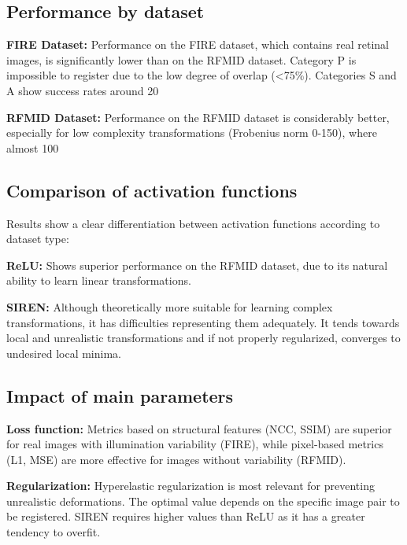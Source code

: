 \subsection{Performance by dataset}
\label{subsec:Rendemento por dataset}

\textbf{FIRE Dataset:} Performance on the FIRE dataset, which contains real retinal images, is significantly lower than on the RFMID dataset. Category P is impossible to register due to the low degree of overlap (<75\%). Categories S and A show success rates around 20%

\textbf{RFMID Dataset:} Performance on the RFMID dataset is considerably better, especially for low complexity transformations (Frobenius norm 0-150), where almost 100%

\subsection{Comparison of activation functions}
\label{subsec:Comparación de funcións de activación}

Results show a clear differentiation between activation functions according to dataset type:

\textbf{ReLU:} Shows superior performance on the RFMID dataset, due to its natural ability to learn linear transformations.

\textbf{SIREN:} Although theoretically more suitable for learning complex transformations, it has difficulties representing them adequately. It tends towards local and unrealistic transformations and if not properly regularized, converges to undesired local minima.

\subsection{Impact of main parameters}
\label{subsec:Impacto dos parámetros principais}

\textbf{Loss function:} Metrics based on structural features (NCC, SSIM) are superior for real images with illumination variability (FIRE), while pixel-based metrics (L1, MSE) are more effective for images without variability (RFMID).

\textbf{Regularization:} Hyperelastic regularization is most relevant for preventing unrealistic deformations. The optimal value depends on the specific image pair to be registered. SIREN requires higher values than ReLU as it has a greater tendency to overfit.

